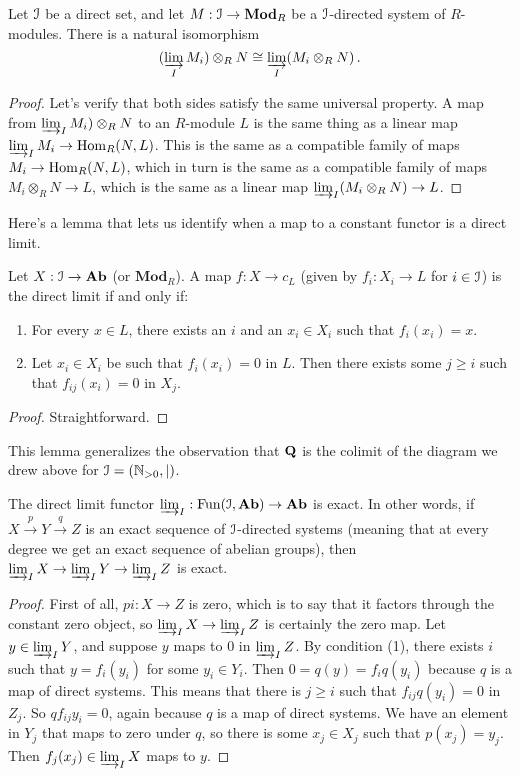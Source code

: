 \begin{prop}
Let $\mathcal I$ be a direct set, and let $M:\mathcal I\to\mathbf{Mod}_R$ be a $\mathcal I$-directed system of $R$-modules. There is a natural isomorphism 
\[
(\varinjlim_I M_i)\otimes_R N\cong \varinjlim_I (M_i\otimes_R N)\,.
\]
\end{prop}
\begin{proof}
Let's verify that both sides satisfy the same universal property. 
A map from $\varinjlim_I M_i)\otimes_R N$ to an $R$-module $L$ is the same
thing as a linear map $\varinjlim_IM_i\to\operatorname{Hom}_R(N,L)$. This is the same as
a compatible family of maps $M_i\to\operatorname{Hom}_R(N,L)$, which in turn is the same
as a compatible family of maps $M_i\otimes_RN\to L$, which is the same as
a linear map $\varinjlim_I(M_i\otimes_RN)\to L$. 
\end{proof}

Here's a lemma that lets us identify when a map to a constant functor is a
direct limit.
\begin{lemma}
Let $X:\mathcal I\to\mathbf{Ab}$ (or $\mathbf{Mod}_R$). A map $f:X\to c_L$ (given
by $f_i:X_i\to L$ for $i\in\mathcal I$) is the direct limit if and only if:
\begin{enumerate}
\item For every $x\in L$, there exists an $i$ and an $x_i\in X_i$ such that $f_i(x_i)=x$.
\item Let $x_i\in X_i$ be such that $f_i(x_i)=0$ in $L$. Then there exists some $j\geq i$ such that $f_{ij}(x_i)=0$ in $X_j$.
\end{enumerate}
\end{lemma}
\begin{proof}
Straightforward.
\end{proof}
This lemma generalizes the observation that $\mathbf Q$ is the colimit of the diagram we drew above for $\mathcal I=(\mathbb N_{>0},|)$. 
\begin{prop}
The direct limit functor $\varinjlim_I:\operatorname{Fun}(\mathcal I,\mathbf{Ab})\to\mathbf{Ab}$ is exact. In other words, if $X\xrightarrow{p}Y\xrightarrow{q}Z$ is an exact sequence of $\mathcal I$-directed systems (meaning that at every degree we get an exact sequence of abelian groups), then $\varinjlim_IX\rightarrow \varinjlim_IY\rightarrow\varinjlim_IZ$ is exact.
\end{prop}
\begin{proof}
First of all, $pi:X\to Z$ is zero, which is to say that it factors through the constant zero object, so $\varinjlim_IX\to \varinjlim_I Z$ is certainly the zero map. Let $y\in \varinjlim_IY$, and suppose $y$ maps to $0$ in $\varinjlim_IZ$. By condition (1), there exists $i$ such that $y=f_i(y_i)$ for some $y_i\in Y_i$. Then $0=q(y)=f_iq(y_i)$ because $q$ is a map of direct systems. This means that there is $j\geq i$ such that $f_{ij}q(y_i)=0$ in $Z_j$. So $qf_{ij}y_i=0$,
again because $q$ is a map of direct systems. We have an element in $Y_j$ that maps to zero under $q$, so there is some $x_j\in X_j$ such that $p(x_j)=y_j$.
Then $f_j(x_j)\in \varinjlim_IX$ maps to $y$.
\end{proof}

